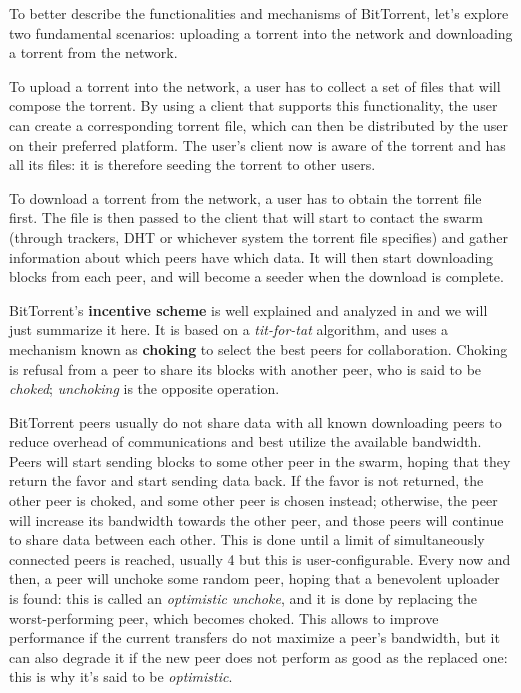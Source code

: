 \documentclass[mscthesis]{usiinfthesis}
\begin{document}
To better describe the functionalities and mechanisms of BitTorrent, let's explore two fundamental scenarios: uploading a torrent into the network and downloading a torrent from the network.

To upload a torrent into the network, a user has to collect a set of files that will compose the torrent. By using a client that supports this functionality, the user can create a corresponding torrent file, which can then be distributed by the user on their preferred platform. The user's client now is aware of the torrent and has all its files: it is therefore seeding the torrent to other users.

To download a torrent from the network, a user has to obtain the torrent file first. The file is then passed to the client that will start to contact the swarm (through trackers, DHT or whichever system the torrent file specifies) and gather information about which peers have which data. It will then start downloading blocks from each peer, and will become a seeder when the download is complete.

BitTorrent's \textbf{incentive scheme} is well explained and analyzed in \cite{cohen2003incentives} and we will just summarize it here. It is based on a \textit{tit-for-tat} algorithm, and uses a mechanism known as \textbf{choking} to select the best peers for collaboration. Choking is refusal from a peer to share its blocks with another peer, who is said to be \textit{choked}; \textit{unchoking} is the opposite operation.

BitTorrent peers usually do not share data with all known downloading peers to reduce overhead of communications and best utilize the available bandwidth. Peers will start sending blocks to some other peer in the swarm, hoping that they return the favor and start sending data back. If the favor is not returned, the other peer is choked, and some other peer is chosen instead; otherwise, the peer will increase its bandwidth towards the other peer, and those peers will continue to share data between each other. This is done until a limit of simultaneously connected peers is reached, usually 4 but this is user-configurable. Every now and then, a peer will unchoke some random peer, hoping that a benevolent uploader is found: this is called an \textit{optimistic unchoke}, and it is done by replacing the worst-performing peer, which becomes choked. This allows to improve performance if the current transfers do not maximize a peer's bandwidth, but it can also degrade it if the new peer does not perform as good as the replaced one: this is why it's said to be \textit{optimistic}.
\end{document}
